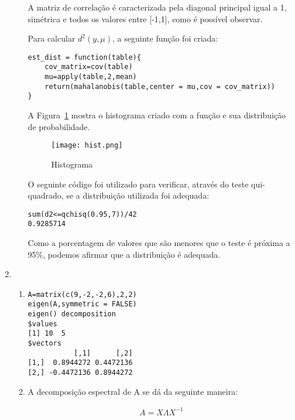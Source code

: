 \documentclass[11pt,a4paper]{book}
\begin{document}
\begin{enumerate}
\begin{enumerate}[label=\alph*)]
			A matriz de correlação é caracterizada pela diagonal principal igual a 1, simétrica e todos os valores entre [-1,1], como é possível observar.
			
			Para calcular $d^2(y,\mu)$, a seguinte função foi criada:
			
			\begin{lstlisting}
est_dist = function(table){
    cov_matrix=cov(table)
    mu=apply(table,2,mean)
    return(mahalanobis(table,center = mu,cov = cov_matrix))
}
			\end{lstlisting}
			
			A Figura~\ref{fig:fig2} mostra o histograma criado com a função e sua distribuição de probabilidade.			
			
			\begin{figure}[h]
			\centering
			\texttt{[image: hist.png]}
			\caption{Histograma}
			\label{fig:fig2}
			\end{figure}
			
			O seguinte código foi utilizado para verificar, através do teste qui-quadrado, se a distribuição utilizada foi adequada:
			
			\begin{lstlisting}
sum(d2<=qchisq(0.95,7))/42
0.9285714
			\end{lstlisting}
			
			Como a porcentagem de valores que são menores que o teste é próxima a 95\%, podemos afirmar que a distribuição é adequada.
		\end{enumerate}
		\item
		\begin{enumerate}[label=\alph*)]
			\item
			\begin{lstlisting}
A=matrix(c(9,-2,-2,6),2,2)
eigen(A,symmetric = FALSE)
eigen() decomposition
$values
[1] 10  5
$vectors
           [,1]      [,2]
[1,]  0.8944272 0.4472136
[2,] -0.4472136 0.8944272
			\end{lstlisting}
			\item A decomposição espectral de A se dá da seguinte maneira:
			
			\begin{eqnarray*}
				A=X\Lambda X^{-1}
			\end{eqnarray*}
			

\end{enumerate}
\end{enumerate}
\end{document}
